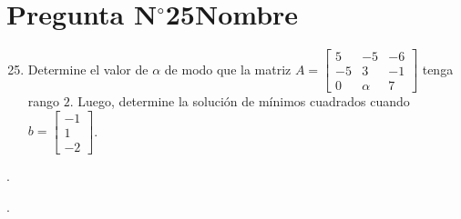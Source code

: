 \section{Pregunta N$^{\circ}$25\qquad Nombre}

\begin{frame}
	\begin{enumerate}\setcounter{enumi}{24}
		\item

		      Determine el valor de $\alpha$ de modo que la matriz
		      \begin{math}
			      A=
			      \begin{bmatrix}
				      5  & -5     & -6 \\
				      -5 & 3      & -1 \\
				      0  & \alpha & 7
			      \end{bmatrix}
		      \end{math}
		      tenga rango $2$.
		      Luego, determine la solución de mínimos cuadrados cuando
		      \begin{math}
			      b=
			      \begin{bmatrix}
				      -1 \\
				      1  \\
				      -2
			      \end{bmatrix}
		      \end{math}.
	\end{enumerate}

	\begin{solution}

		.
	\end{solution}
\end{frame}

\begin{frame}
	\begin{solution}

		.
	\end{solution}
\end{frame}